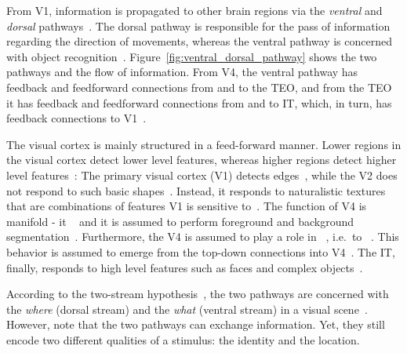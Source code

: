 From \ac{V1}, information is propagated to other brain regions via the \textit{ventral} and \textit{dorsal} pathways~\citep[pp. 563, 563]{mack2013principles}.
The dorsal pathway is responsible for the pass of information regarding the direction of movements, whereas the ventral pathway is concerned with object recognition~\citep[p. 564]{mack2013principles}.
Figure~\ref{fig:ventral_dorsal_pathway} shows the two pathways and the flow of information.
From V4, the ventral pathway has feedback and feedforward connections from and to the \ac{TEO}, and from the \ac{TEO} it has feedback and feedforward connections from and to \acf{IT}, which, in turn, has feedback connections to \ac{V1}~\citep[p. 563]{mack2013principles}.

The visual cortex is mainly structured in a feed-forward manner.
Lower regions in the visual cortex detect lower level features, whereas higher regions detect higher level features~\citep{eickenberg2017seeing}:
The primary visual cortex (\ac{V1}) detects edges~\citep{hubel1962receptive, eickenberg2017seeing}, while the \ac{V2} does not respond to such basic shapes~\citep{freeman2013functional}.
Instead, it responds to naturalistic textures that are combinations of features \ac{V1} is sensitive to~\citep{freeman2013functional}.
The function of V4 is manifold - it ~\citep{eickenberg2017seeing} and it is assumed to perform foreground and background segmentation~\citep{roe2012toward}.
Furthermore, the \ac{V4} is assumed to play a role in ~\citep{roe2012toward}, i.e.~to ~\citep{roe2012toward}.
This behavior is assumed to emerge from the top-down connections into \ac{V4}~\citep{roe2012toward}.
The \ac{IT}, finally, responds to high level features such as faces and complex objects~\citep{logothetis1995shape, eickenberg2017seeing}.

According to the two-stream hypothesis~\citep{goodale1992separate}, the two pathways are concerned with the \textit{where} (dorsal stream) and the \textit{what} (ventral stream) in a visual scene~\citep[p. 520]{mack2013principles}.
However, \citet[p. 564]{mack2013principles} note that the two pathways can exchange information.
Yet, they still encode two different qualities of a stimulus: the identity and the location.

